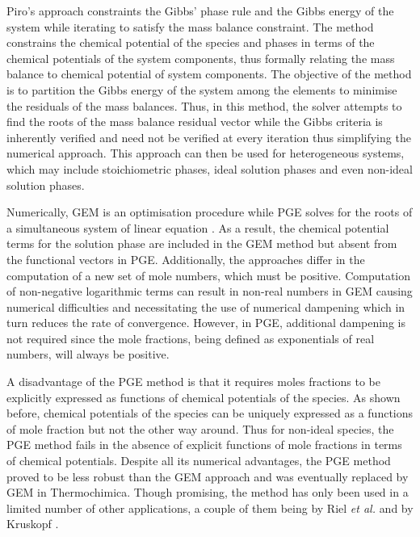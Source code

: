 	Piro's approach \cite{Piro13} constraints the Gibbs' phase rule and the Gibbs energy of the system while iterating to satisfy the mass balance constraint. The method constrains the chemical potential of the species and phases in terms of the chemical potentials of the system components, thus formally relating the mass balance to chemical potential of system components. The objective of the method is to partition the Gibbs energy of the system among the elements to minimise the residuals of the mass balances. Thus, in this method, the solver attempts to find the roots of the mass balance residual vector while the Gibbs criteria is inherently verified and need not be verified at every iteration thus simplifying the numerical approach. This approach can then be used for heterogeneous systems, which may include stoichiometric phases, ideal solution phases and even non-ideal solution phases.

	Numerically, GEM is an optimisation procedure while PGE solves for the roots of a simultaneous system of linear equation \cite{vanZeggeren11}. As a result, the chemical potential terms for the solution phase are included in the GEM method but absent from the functional vectors in PGE. Additionally, the approaches differ in the computation of a new set of mole numbers, which must be positive. Computation of non-negative logarithmic terms can result in non-real numbers in GEM causing numerical difficulties and necessitating the use of numerical dampening which in turn reduces the rate of convergence. However, in PGE, additional dampening is not required since the mole fractions, being defined as exponentials of real numbers, will always be positive.

	A disadvantage of the PGE method is that it requires moles fractions to be explicitly expressed as functions of chemical potentials of the species. As shown before, chemical potentials of the species can be uniquely expressed as a functions of mole fraction but not the other way around. Thus for non-ideal species, the PGE method fails in the absence of explicit functions of mole fractions in terms of chemical potentials. Despite all its numerical advantages, the PGE method proved to be less robust than the GEM approach and was eventually replaced by GEM in Thermochimica. Though promising, the method has only been used in a limited number of other applications, a couple of them being by Riel \textit{et al.} \cite{Riel:2022aa} and by Kruskopf \cite{Kruskopf:2018aa}.

